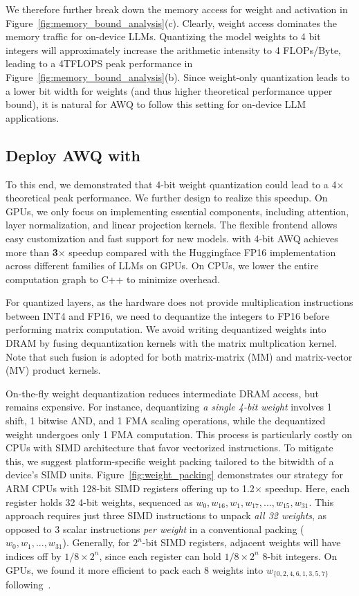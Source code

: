  We therefore further break down the memory access for weight and activation in Figure~\ref{fig:memory_bound_analysis}(c). Clearly, weight access dominates the memory traffic for on-device LLMs. Quantizing the model weights to 4 bit integers will approximately increase the arithmetic intensity to 4 FLOPs/Byte, leading to a 4TFLOPS peak performance in Figure~\ref{fig:memory_bound_analysis}(b). Since weight-only quantization leads to a lower bit width for weights (and thus higher theoretical performance upper bound), it is natural for AWQ to follow this setting for on-device LLM applications.


\subsection{Deploy AWQ with \system}

To this end, we demonstrated that 4-bit weight quantization could lead to a 4$\times$ theoretical peak performance. We further design \system to realize this speedup. On GPUs, we only focus on implementing essential components, including attention, layer normalization, and linear projection kernels. The flexible frontend allows easy customization and fast support for new models. \system with 4-bit AWQ achieves more than \textbf{3$\times$} speedup compared with the Huggingface FP16 implementation across different families of LLMs on GPUs. On CPUs, we lower the entire computation graph to C++ to minimize overhead.

 For quantized layers, as the hardware does not provide multiplication instructions between INT4 and FP16, we need to dequantize the integers to FP16 before performing matrix computation. We avoid writing dequantized weights into DRAM by fusing dequantization kernels with the matrix multplication kernel. Note that such fusion is adopted for both matrix-matrix (MM) and matrix-vector (MV) product kernels. %


 On-the-fly weight dequantization reduces intermediate DRAM access, but remains expensive. For instance, dequantizing \textit{a single 4-bit weight} involves 1 shift, 1 bitwise AND, and 1 FMA scaling operations, while the dequantized weight undergoes only 1 FMA computation. This process is particularly costly on CPUs with SIMD architecture that favor vectorized instructions. To mitigate this, we suggest platform-specific weight packing tailored to the bitwidth of a device's SIMD units. Figure~\ref{fig:weight_packing} demonstrates our strategy for ARM CPUs with 128-bit SIMD registers offering up to 1.2$\times$ speedup. Here, each register holds 32 4-bit weights, sequenced as $w_0, w_{16}, w_{1}, w_{17}, ..., w_{15}, w_{31}$. This approach requires just three SIMD instructions to unpack \textit{all 32 weights}, as opposed to 3 scalar instructions \textit{per weight} in a conventional packing ($w_0, w_1, ..., w_{31}$). Generally, for $2^n$-bit SIMD registers, adjacent weights will have indices off by $1/8\times2^n$, since each register can hold $1/8\times2^n$ 8-bit integers. On GPUs, we found it more efficient to pack each 8 weights into $w_{\{0,2,4,6,1,3,5,7\}}$ following~\cite{kim2022says}. 

